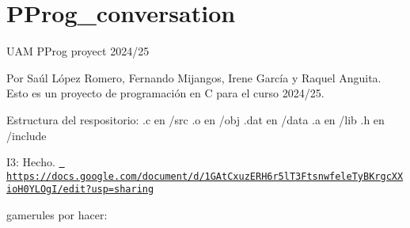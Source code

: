 \chapter{PProg\+\_\+conversation}
\hypertarget{md_README}{}\label{md_README}
\label{md_README_autotoc_md0}%
%
UAM PProg proyect 2024/25

Por Saúl López Romero, Fernando Mijangos, Irene García y Raquel Anguita. Esto es un proyecto de programación en C para el curso 2024/25.

Estructura del respositorio\+: .c en /src .o en /obj .dat en /data .a en /lib .h en /include

I3\+: Hecho. \href{https://docs.google.com/document/d/1GAtCxuzERH6r5lT3FtsnwfeleTyBKrgcXXioH0YLOgI/edit?usp=sharing}{\texttt{ https\+://docs.\+google.\+com/document/d/1\+GAt\+Cxuz\+ERH6r5l\+T3\+Ftsnwfele\+Ty\+BKrgc\+XXio\+H0\+YLOg\+I/edit?usp=sharing}}

gamerules por hacer\+:


